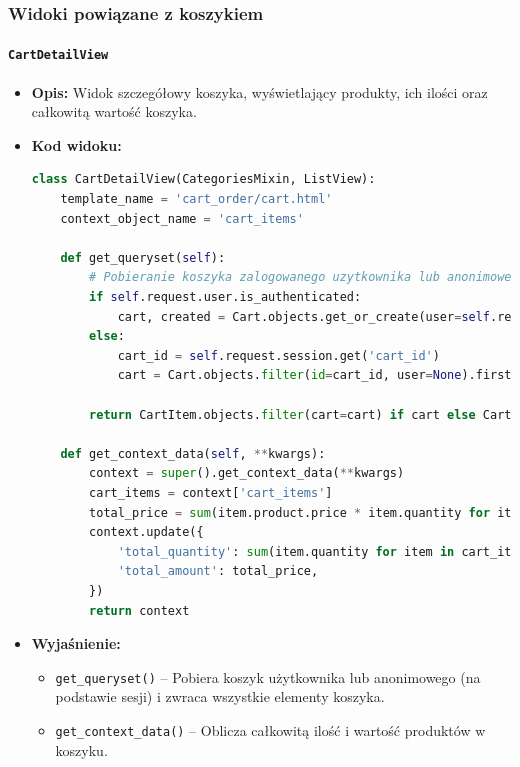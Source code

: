 \documentclass[12pt,a4paper,oneside]{article}
\theoremstyle{definition}
\numberwithin{equation}{section}
\begin{document}
\subsubsection*{Widoki powiązane z koszykiem}


\paragraph{\texttt{CartDetailView}}
\begin{itemize}
    \item \textbf{Opis:} Widok szczegółowy koszyka, wyświetlający produkty, ich ilości oraz całkowitą wartość koszyka.
    \item \textbf{Kod widoku:}
\begin{lstlisting}[language=Python, caption=Kod widoku CartDetailView]
class CartDetailView(CategoriesMixin, ListView):
    template_name = 'cart_order/cart.html'
    context_object_name = 'cart_items'

    def get_queryset(self):
        # Pobieranie koszyka zalogowanego uzytkownika lub anonimowego
        if self.request.user.is_authenticated:
            cart, created = Cart.objects.get_or_create(user=self.request.user)
        else:
            cart_id = self.request.session.get('cart_id')
            cart = Cart.objects.filter(id=cart_id, user=None).first() if cart_id else None

        return CartItem.objects.filter(cart=cart) if cart else CartItem.objects.none()

    def get_context_data(self, **kwargs):
        context = super().get_context_data(**kwargs)
        cart_items = context['cart_items']
        total_price = sum(item.product.price * item.quantity for item in cart_items)
        context.update({
            'total_quantity': sum(item.quantity for item in cart_items),
            'total_amount': total_price,
        })
        return context
\end{lstlisting}

    \item \textbf{Wyjaśnienie:}
    \begin{itemize}
        \item \texttt{get\_queryset()} – Pobiera koszyk użytkownika lub anonimowego (na podstawie sesji) i zwraca wszystkie elementy koszyka.
        \item \texttt{get\_context\_data()} – Oblicza całkowitą ilość i wartość produktów w koszyku.
    \end{itemize}
\end{itemize}
\end{document}
